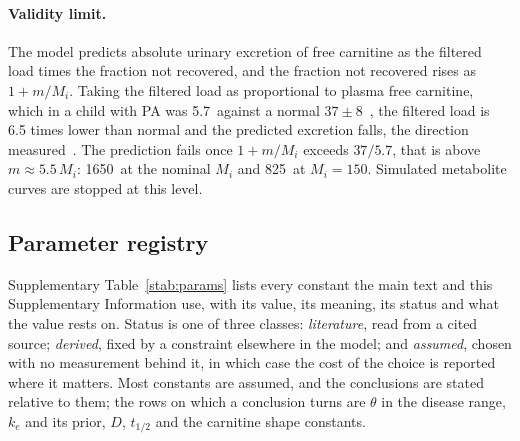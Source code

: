 \paragraph{Validity limit.} The model predicts absolute urinary excretion of free carnitine
as the filtered load times the fraction not recovered, and the fraction not recovered rises
as $1+m/M_i$. Taking the filtered load as proportional to plasma free carnitine, which in a
child with PA was 5.7\uM\ against a normal $37\pm8$\uM~\cite{carnitine_pa_child}, the
filtered load is 6.5 times lower than normal and the predicted excretion falls, the direction
measured~\cite{carnitine_excretion_pa}. The prediction fails once $1+m/M_i$ exceeds
$37/5.7$, that is above $m\approx5.5\,M_i$: 1650\uM\ at the nominal $M_i$ and 825\uM\ at
$M_i=150$\uM. Simulated metabolite curves are stopped at this level.

\subsection{Parameter registry}
\label{si:s1-reg}

Supplementary Table~\ref{stab:params} lists every constant the main text and this
Supplementary Information use, with its value, its meaning, its status and what the value
rests on. Status is one of three classes: \emph{literature}, read from a cited source;
\emph{derived}, fixed by a constraint elsewhere in the model; and \emph{assumed}, chosen with
no measurement behind it, in which case the cost of the choice is reported where it matters.
Most constants are assumed, and the conclusions are stated relative to them; the rows on
which a conclusion turns are $\theta$ in the disease range, $k_e$ and its prior, $D$,
$t_{1/2}$ and the carnitine shape constants.

